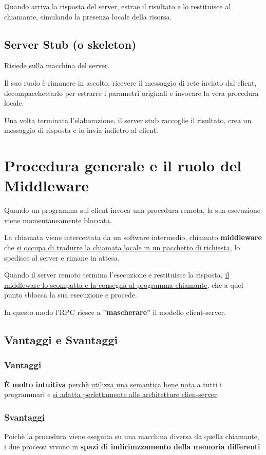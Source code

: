 Quando arriva la risposta del server, estrae il risultato e lo restituisce al chiamante, simulando la presenza locale della risorsa.
\subsection{Server Stub (o skeleton)}
Risiede sulla macchina del server.

Il suo ruolo è rimanere in ascolto, ricevere il messaggio di rete inviato dal client, decompacchettarlo per estrarre i parametri originali e invocare la vera procedura locale.

Una volta terminata l'elaborazione, il server stub raccoglie il risultato, crea un messaggio di risposta e lo invia indietro al client.

\section{Procedura generale e il ruolo del Middleware}
Quando un programma sul client invoca una procedura remota, la sua esecuzione viene momentaneamente bloccata.

La chiamata viene intercettata da un software intermedio, chiamato \textbf{middleware} che \uline{si occupa di tradurre la chiamata locale in un pacchetto di richiesta}, lo spedisce al server e rimane in attesa.

Quando il server remoto termina l'esecuzione e restituisce la risposta, \uline{il middleware lo scompatta e la consegna al programma chiamante}, che a quel punto sblocca la sua esecuzione e procede.

In questo modo l'RPC riesce a \textbf{"mascherare"} il modello client-server.

\subsection{Vantaggi e Svantaggi}
\subsubsection{Vantaggi}
\textbf{È molto intuitiva} perchè \uline{utilizza una semantica bene nota} a tutti i programmari e \uline{si adatta perfettamente alle architetture clien-server}.
\subsubsection{Svantaggi}
Poichè la procedura viene eseguita su una macchina diversa da quella chiamante, i due processi vivono in \textbf{spazi di indirimzzamento della memoria differenti}.

